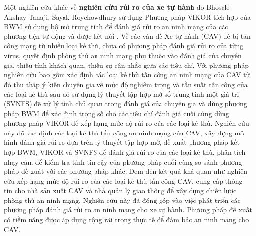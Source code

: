 Một nghiên cứu khác về \textbf{nghiên cứu rủi ro của xe tự hành} do Bhosale Akshay Tanaji, Sayak Roychowdhury sử dụng Phương pháp VIKOR tích hợp của BWM sử dụng bộ mờ trung tính để đánh giá rủi ro an ninh mạng của các phương tiện tự động và được kết nối \cite{sciencedirect2}. Về các vấn đề Xe tự hành (CAV) dễ bị tấn công mạng từ nhiều loại kẻ thù, chưa có phương pháp đánh giá rủi ro của từng virus, quyết định phòng thủ an ninh mạng phụ thuộc vào đánh giá của chuyên gia, thiếu tính khách quan, thiếu sự cân nhắc giữa các tiêu chí. Với phương pháp nghiên cứu bao gồm xác định các loại kẻ thù tấn công an ninh mạng của CAV từ đó thu thập ý kiến chuyên gia về mức độ nghiêm trọng và tần suất tấn công của các loại kẻ thù sau đó sử dụng lý thuyết tập hợp mờ số trung tính một giá trị (SVNFS) để xử lý tính chủ quan trong đánh giá của chuyên gia và dùng phương pháp BWM để xác định trọng số cho các tiêu chí đánh giá cuối cùng dùng phương pháp VIKOR để xếp hạng mức độ rủi ro của các loại kẻ thù. Nghiên cứu này đã xác định các loại kẻ thù tấn công an ninh mạng của CAV, xây dựng mô hình đánh giá rủi ro dựa trên lý thuyết tập hợp mờ, đề xuất phương pháp kết hợp BWM, VIKOR và SVNFS để đánh giá rủi ro của các loại kẻ thù, phân tích nhạy cảm để kiểm tra tính tin cậy của phương pháp cuối cùng so sánh phương pháp đề xuất với các phương pháp khác. Đem đến kết quả khả quan như nghiên cứu xếp hạng mức độ rủi ro của các loại kẻ thù tấn công CAV, cung cấp thông tin cho nhà sản xuất CAV và nhà quản lý giao thông để xây dựng chiến lược phòng thủ an ninh mạng. Nghiên cứu này đã đóng góp vào việc phát triển các phương pháp đánh giá rủi ro an ninh mạng cho xe tự hành. Phương pháp đề xuất có tiềm năng được áp dụng rộng rãi trong thực tế để đảm bảo an ninh mạng cho CAV.

